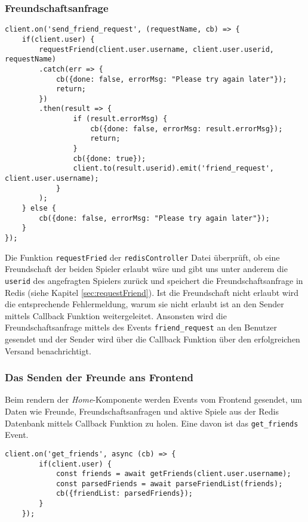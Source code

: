 \subsubsection{Freundschaftsanfrage}
\label{sec:Freundschaftsanfrage-backend}
\begin{lstlisting}[style=codeStyle, caption={Der Listener des send\_friend\_request Events}, label={lst:sendFriendRequest}]
client.on('send_friend_request', (requestName, cb) => {
    if(client.user) {
        requestFriend(client.user.username, client.user.userid, requestName)
        .catch(err => {            
            cb({done: false, errorMsg: "Please try again later"});
            return;
        })
        .then(result => {
                if (result.errorMsg) {
                    cb({done: false, errorMsg: result.errorMsg});
                    return;
                }
                cb({done: true});
                client.to(result.userid).emit('friend_request', client.user.username);
            }
        );
    } else {
        cb({done: false, errorMsg: "Please try again later"});
    }
});
\end{lstlisting}

Die Funktion \verb|requestFried| der \verb|redisController| Datei überprüft, ob eine Freundschaft der beiden Spieler erlaubt wäre und gibt uns unter anderem die \verb|userid| des angefragten Spielers zurück und speichert die Freundschaftsanfrage in Redis (siehe Kapitel \ref{sec:requestFriend}). Ist die Freundschaft nicht erlaubt wird die entsprechende Fehlermeldung, warum sie nicht erlaubt ist an den Sender mittels Callback Funktion weitergeleitet. Ansonsten wird die Freundschaftsanfrage mittels des Events \verb|friend_request| an den Benutzer gesendet und der Sender wird über die Callback Funktion über den erfolgreichen Versand benachrichtigt.

\subsubsection{Das Senden der Freunde ans Frontend}
\label{sec:Senden-der-Freunde}
Beim rendern der \textit{Home}-Komponente werden Events vom Frontend gesendet, um Daten wie Freunde, Freundschaftsanfragen und aktive Spiele aus der Redis Datenbank mittels Callback Funktion zu holen. Eine davon ist das \verb|get_friends| Event.

\begin{lstlisting}[style=codeStyle, caption={Der get\_friends Listener}, label={lst:get_friends}]
    client.on('get_friends', async (cb) => {
        if(client.user) {
            const friends = await getFriends(client.user.username);
            const parsedFriends = await parseFriendList(friends);
            cb({friendList: parsedFriends});
        }
    });
\end{lstlisting}

